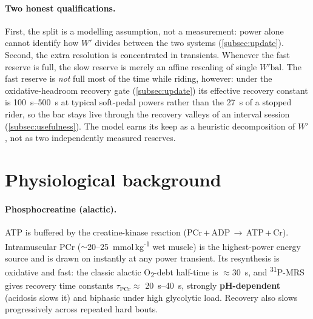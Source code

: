 \documentclass[11pt,a4paper]{article}
\newcommand{\Wp}{\ensuremath{W'}}
\newcommand{\Wbal}{\ensuremath{W'\!\text{bal}}}
\newcommand{\tauPCr}{\ensuremath{\tau_{\mathrm{PCr}}}}
\newcommand{\degC}{\textsuperscript{31}P-MRS}
\begin{document}
\paragraph{Two honest qualifications.} First, the split is a modelling assumption, not a measurement:
power alone cannot identify how \Wp{} divides between the two systems (\cref{subsec:update}). Second, the
extra resolution is concentrated in transients. Whenever the fast reserve is full, the slow reserve is
merely an affine rescaling of single \Wbal. The fast reserve is \emph{not} full most of the time while
riding, however: under the oxidative-headroom recovery gate (\cref{subsec:update}) its effective recovery
constant is \SIrange{100}{500}{\second} at typical soft-pedal powers rather than the \SI{27}{\second} of a
stopped rider, so the bar stays live through the recovery valleys of an interval session
(\cref{subsec:usefulness}). The model earns its keep as a heuristic decomposition of \Wp, not as two
independently measured reserves.

\section{Physiological background}\label{sec:physio}

\paragraph{Phosphocreatine (alactic).} ATP is buffered by the creatine-kinase reaction
(PCr\,+\,ADP\,$\rightarrow$\,ATP\,+\,Cr). Intramuscular PCr ($\sim$20--25~mmol\,kg\textsuperscript{-1} wet
muscle) is the highest-power energy source and is drawn on instantly at any power transient. Its
resynthesis is oxidative and fast: the classic alactic O\textsubscript{2}-debt half-time is
$\approx$\SI{30}{\second},\citep{Margaria1933} and \degC{} gives recovery time constants
$\tauPCr \approx$ \SIrange{20}{40}{\second}, strongly \textbf{pH-dependent} (acidosis slows it) and
biphasic under high glycolytic load.\citep{Harris1976,Yoshida2013} Recovery also slows progressively
across repeated hard bouts.
\end{document}
